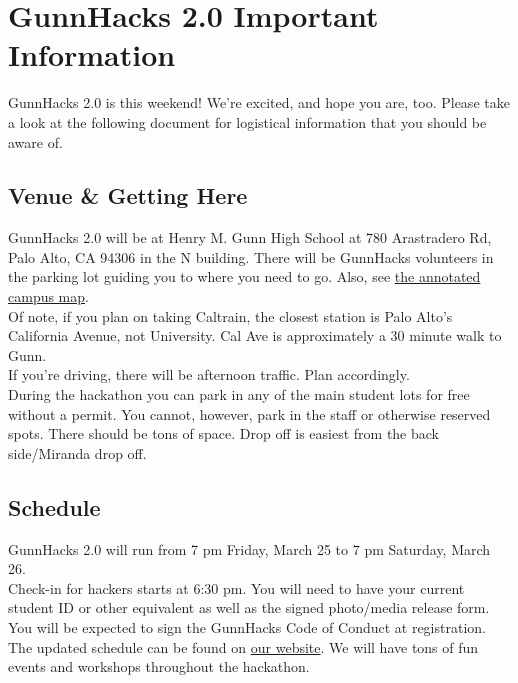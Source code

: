 \documentclass[12pt,onesided,letterpaper]{article}
\begin{document}
\section*{GunnHacks 2.0 Important Information}

GunnHacks 2.0 is this weekend! We're excited, and hope you are, too. Please take a look at the following document for logistical information that you should be aware of.

\subsection*{Venue \& Getting Here}

GunnHacks 2.0 will be at Henry M. Gunn High School at 780 Arastradero Rd, Palo Alto, CA 94306 in the N building. There will be GunnHacks volunteers in the parking lot guiding you to where you need to go. Also, see \href{https://gunnhacks.com/map.pdf}{the annotated campus map}.\\

Of note, if you plan on taking Caltrain, the closest station is Palo Alto's California Avenue, not University. Cal Ave is approximately a 30 minute walk to Gunn.\\

If you're driving, there will be afternoon traffic. Plan accordingly.\\

During the hackathon you can park in any of the main student lots for free without a permit. You cannot, however, park in the staff or otherwise reserved spots. There should be tons of space. Drop off is easiest from the back side\slash Miranda drop off.

\subsection*{Schedule}

GunnHacks 2.0 will run from 7 pm Friday, March 25 to 7 pm Saturday, March 26.\\

Check-in for hackers starts at 6:30 pm. You will need to have your current student ID or other equivalent as well as the signed photo\slash media release form. You will be expected to sign the GunnHacks Code of Conduct at registration.\\

The updated schedule can be found on \href{https://gunnhacks.com}{our website}. We will have tons of fun events and workshops throughout the hackathon.
\end{document}
